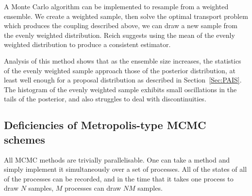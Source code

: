\documentclass[final]{siamltex}
\begin{document}
A Monte Carlo algorithm can be implemented to resample from a weighted ensemble. We create a weighted sample, then solve the optimal transport problem which produces the coupling described above, we can draw a new sample from the evenly weighted distribution. Reich suggests using the mean of the evenly weighted distribution to produce a consistent estimator.

Analysis of this method shows that as the ensemble size increases, the statistics of the evenly weighted sample approach those of the posterior distribution, at least well enough for a proposal distribution as described in Section~\ref{Sec:PAIS}. The histogram of the evenly weighted sample exhibits small oscillations in the tails of the posterior, and also struggles to deal with discontinuities.




\subsection{Deficiencies of Metropolis-type MCMC schemes}
All MCMC methods are trivially parallelisable. One can take a method
and simply implement it simultaneously over a set of processes. All
of the states of all of the processes can be recorded, and in the time
that it takes one process to draw $N$ samples, $M$ processes can draw
$NM$ samples. 
\end{document}
